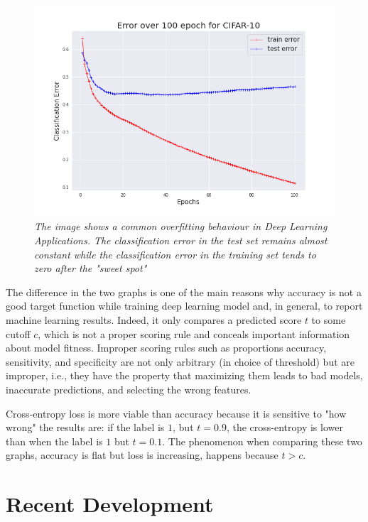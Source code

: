 \documentclass[11pt,a4paper]{article}
\begin{document}
\begin{figure}[H]
  \centering
  \includegraphics[scale=0.4]{../images/cifar10_100epochs_error.png}
  \caption{\textit{The image shows a common overfitting behaviour in Deep Learning Applications. The classification error in the test set remains almost constant while the classification error in the training set tends to zero after the "sweet spot"}}
  \label{cifar-overfit-error}
\end{figure}

The difference in the two graphs is one of the main reasons why accuracy is not a good target function while training deep learning model and, in general, to report machine learning results. Indeed, it only compares a predicted score $t$ to some cutoff $c$, which is not a proper scoring rule and conceals important information about model fitness.
Improper scoring rules such as proportions accuracy, sensitivity, and specificity are not only arbitrary (in choice of threshold) but are improper, i.e., they have the property that maximizing them leads to bad models, inaccurate predictions, and selecting the wrong features. 

Cross-entropy loss is more viable than accuracy because it is sensitive to "how wrong" the results are: if the label is $1$, but $t=0.9$, the cross-entropy is lower than when the label is $1$ but $t=0.1$.
The phenomenon when comparing these two graphs, accuracy is flat but loss is increasing, happens because $t>c$.

\newpage
\section*{Recent Development}
\end{document}
